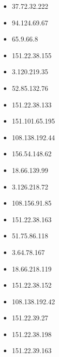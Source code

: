 \documentclass{article}
\begin{document}
\begin{itemize}
            \item 37.72.32.222
        
            \item 94.124.69.67
        
            \item 65.9.66.8
        
            \item 151.22.38.155
        
            \item 3.120.219.35
        
            \item 52.85.132.76
        
            \item 151.22.38.133
        
            \item 151.101.65.195
        
            \item 108.138.192.44
        
            \item 156.54.148.62
        
            \item 18.66.139.99
        
            \item 3.126.218.72
        
            \item 108.156.91.85
        
            \item 151.22.38.163
        
            \item 51.75.86.118
        
            \item 3.64.78.167
        
            \item 18.66.218.119
        
            \item 151.22.38.152
        
            \item 108.138.192.42
        
            \item 151.22.39.27
        
            \item 151.22.38.198
        
            \item 151.22.39.163
        

\end{itemize}
\end{document}
